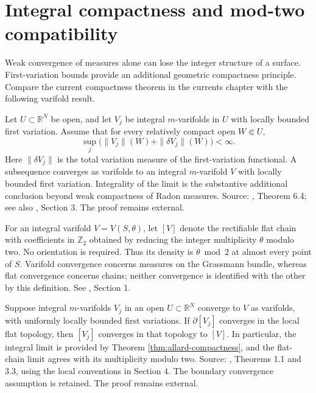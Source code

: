\chapter{Integral compactness and mod-two compatibility}\label{sec:integral-varifold-compactness}
Weak convergence of measures alone can lose the integer structure of a surface. First-variation bounds provide an additional geometric compactness principle. Compare the current compactness theorem in the currents chapter with the following varifold result.

\begin{theorem}\label{thm:allard-compactness}
Let $U\subset\mathbb R^N$ be open, and let $V_j$ be integral $m$-varifolds in $U$ with locally bounded first variation. Assume that for every relatively compact open $W\Subset U$,
\[
 \sup_j\bigl(\|V_j\|(W)+\|\delta V_j\|(W)\bigr)<\infty.
\]
Here $\|\delta V_j\|$ is the total variation measure of the first-variation functional. A subsequence converges as varifolds to an integral $m$-varifold $V$ with locally bounded first variation. Integrality of the limit is the substantive additional conclusion beyond weak compactness of Radon measures. Source: \cite{Allard72}, Theorem 6.4; see also \cite{White09}, Section 3. The proof remains external.
\end{theorem}

\begin{definition}\label{def:varifold-mod-two}
For an integral varifold $V=V(S,\theta)$, let $[V]$ denote the rectifiable flat chain with coefficients in $\mathbb Z_2$ obtained by reducing the integer multiplicity $\theta$ modulo two. No orientation is required. Thus its density is $\theta\bmod 2$ at almost every point of $S$. Varifold convergence concerns measures on the Grassmann bundle, whereas flat convergence concerns chains; neither convergence is identified with the other by this definition. See \cite{White09}, Section 1.
\end{definition}

\begin{theorem}\label{thm:white-mod-two}
Suppose integral $m$-varifolds $V_j$ in an open $U\subset\mathbb R^N$ converge to $V$ as varifolds, with uniformly locally bounded first variations. If $\partial[V_j]$ converges in the local flat topology, then $[V_j]$ converges in that topology to $[V]$. In particular, the integral limit is provided by Theorem \ref{thm:allard-compactness}, and the flat-chain limit agrees with its multiplicity modulo two. Source: \cite{White09}, Theorems 1.1 and 3.3, using the local conventions in Section 4. The boundary convergence assumption is retained. The proof remains external.
\end{theorem}

